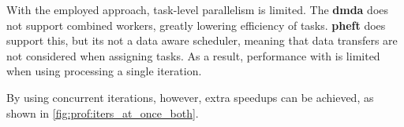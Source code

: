\documentclass[main.tex]{subfiles}
\begin{document}
With the employed approach, task-level parallelism is limited. The \textbf{dmda} does not support combined workers, greatly lowering efficiency of \cpu tasks. \textbf{pheft} does support this, but its not a data aware scheduler, meaning that data transfers are not considered when assigning tasks. As a result, performance with \starpu is limited when using processing a single iteration.


By using concurrent iterations, however, extra speedups can be achieved, as shown in \cref{fig:prof:iters_at_once_both}.
\end{document}

